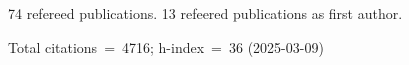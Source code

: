 74 refereed publications. 13 refeered publications as first author.

Total citations~=~4716; h-index~=~36 (2025-03-09)